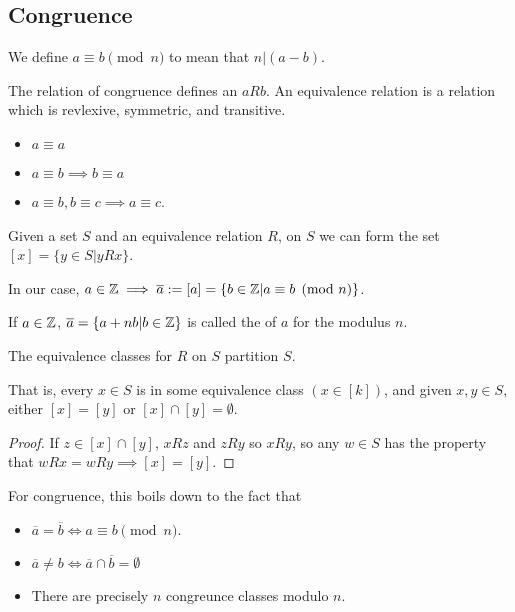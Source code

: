 \documentclass{article}
\begin{document}
\subsection{Congruence}
We define $a \equiv b \pmod n$ to mean that $n | (a - b)$.

\begin{definition}
    The relation of congruence defines an  $a R b$. An equivalence relation is a relation which is revlexive, symmetric, and transitive.

    \begin{itemize}
        \item $a \equiv a$
        \item $a \equiv b \implies b \equiv a$
        \item $a \equiv b, b \equiv c \implies a \equiv c$.
    \end{itemize}
\end{definition}

Given a set $S$ and an equivalence relation $R$, on $S$ we can form the set $[x] = \{y \in S | y R x\}$. 

In our case, $a \in \mathbb Z \implies \overline a := [a] = \{b \in \mathbb Z | a \equiv b \pmod n\}$.

\begin{definition}
    If $a \in \mathbb Z$, $\overline a = \{a + nb | b \in \mathbb Z\}$ is called the  of $a$ for the modulus $n$.
\end{definition}

\begin{proposition}
    The equivalence classes for $R$ on $S$ partition $S$.

    That is, every $x \in S$ is in some equivalence class $(x \in [k])$, and given $x, y \in S$, either $[x] = [y]$ or $[x] \cap [y] = \emptyset$.
\end{proposition}

\begin{proof}
    If $z \in [x] \cap [y]$, $x R z$ and $z R y$ so $x R y$, so any $w \in S$ has the property that $wRx = wRy \implies [x] = [y]$.
\end{proof}

For congruence, this boils down to the fact that 
\begin{itemize}
    \item $\overline a = \overline b \iff a \equiv b \pmod n$.
    \item $\overline a \neq b \iff \overline a \cap \overline b = \emptyset$
    \item There are precisely $n$ congreunce classes modulo $n$.
\end{itemize}
\end{document}
